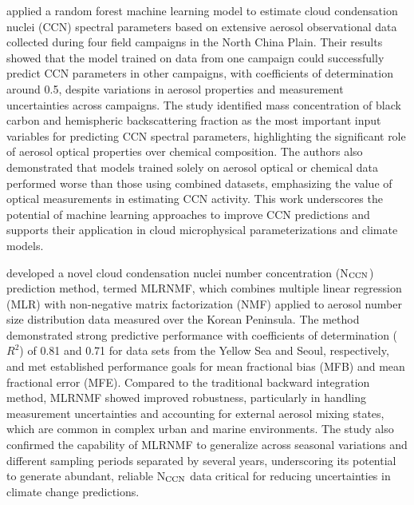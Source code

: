 \documentclass[11pt]{article}
\begin{document}
\citet{liang2022prediction} applied a random forest machine learning model to estimate cloud condensation nuclei (CCN) spectral parameters based on extensive aerosol observational data collected during four field campaigns in the North China Plain. Their results showed that the model trained on data from one campaign could successfully predict CCN parameters in other campaigns, with coefficients of determination around 0.5, despite variations in aerosol properties and measurement uncertainties across campaigns. The study identified mass concentration of black carbon and hemispheric backscattering fraction as the most important input variables for predicting CCN spectral parameters, highlighting the significant role of aerosol optical properties over chemical composition. The authors also demonstrated that models trained solely on aerosol optical or chemical data performed worse than those using combined datasets, emphasizing the value of optical measurements in estimating CCN activity. This work underscores the potential of machine learning approaches to improve CCN predictions and supports their application in cloud microphysical parameterizations and climate models.

\citet{park2023new} developed a novel cloud condensation nuclei number concentration (N$_{\rm CCN}$) prediction method, termed MLRNMF, which combines multiple linear regression (MLR) with non-negative matrix factorization (NMF) applied to aerosol number size distribution data measured over the Korean Peninsula. The method demonstrated strong predictive performance with coefficients of determination (\( R^2 \)) of 0.81 and 0.71 for data sets from the Yellow Sea and Seoul, respectively, and met established performance goals for mean fractional bias (MFB) and mean fractional error (MFE). Compared to the traditional backward integration method, MLRNMF showed improved robustness, particularly in handling measurement uncertainties and accounting for external aerosol mixing states, which are common in complex urban and marine environments. The study also confirmed the capability of MLRNMF to generalize across seasonal variations and different sampling periods separated by several years, underscoring its potential to generate abundant, reliable N$_{\rm CCN}$ data critical for reducing uncertainties in climate change predictions.
\end{document}
